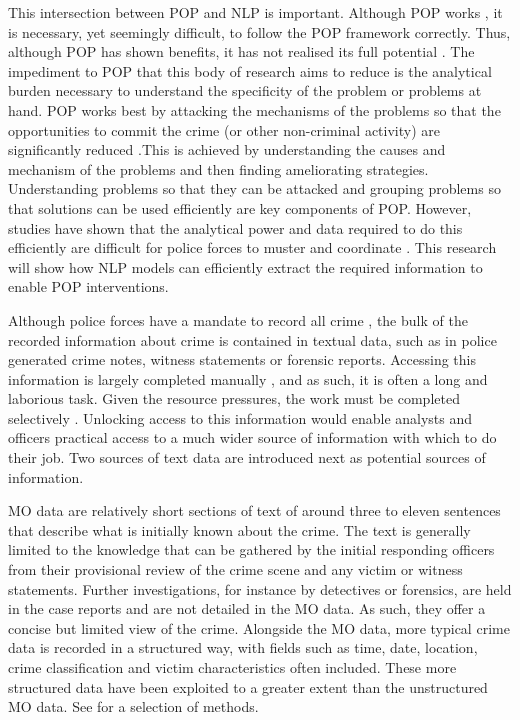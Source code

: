This intersection between POP and NLP is important. Although POP works \parencite{hinkle2020problem}, it is necessary, yet seemingly difficult, to follow the POP framework correctly. Thus, although POP has shown benefits, it has not realised its full potential \parencite{POPUCL}. The impediment to POP that this body of research aims to reduce is the analytical burden necessary to understand the specificity of the problem or problems at hand. POP works best by attacking the mechanisms of the problems so that the opportunities to commit the crime (or other non-criminal activity) are significantly reduced \parencite{clarke2003becoming}.This is achieved by understanding the causes and mechanism of the problems and then finding ameliorating strategies. Understanding problems so that they can be attacked and grouping problems so that solutions can be used efficiently are key components of POP. However, studies have shown that the analytical power and data required to do this efficiently are difficult for police forces to muster and coordinate \parencite{sidebottom2020implementing}. This research will show how NLP models can efficiently extract the required information to enable POP interventions. 

Although police forces have a mandate to record all crime \parencite{home2020crime}, the bulk of the recorded information about crime is contained in textual data, such as in police generated crime notes, witness statements or forensic reports. Accessing this information is largely completed manually \parencite{goldstein1990}, and as such, it is often a long and laborious task. Given the resource pressures, the work must be completed selectively \parencite{rogerson2016utility}. Unlocking access to this information would enable analysts and officers practical access to a much wider source of information with which to do their job.  Two sources of text data are introduced next as potential sources of information.

MO data are relatively short sections of text of around three to eleven sentences that describe what is initially known about the crime. The text is generally limited to the knowledge that can be gathered by the initial responding officers from their provisional review of the crime scene and any victim or witness statements. Further investigations, for instance by detectives or forensics, are held in the case reports and are not detailed in the MO data. As such, they offer a concise but limited view of the crime. Alongside the MO data, more typical crime data is recorded in a structured way, with fields such as time, date, location, crime classification and victim characteristics often included. These more structured data have been exploited to a greater extent than the unstructured MO data. See \textcite{mapchap10, ratcliffe1998aoristic, braga2014effects, weisel2016analyzing} for a selection of methods.


